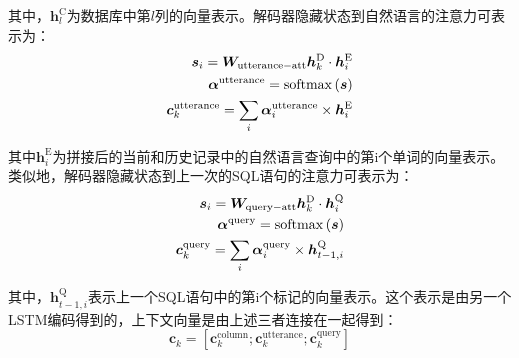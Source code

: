 其中，$\bm{h}_l^\mathrm{C}$为数据库中第$l$列的向量表示。解码器隐藏状态到自然语言的注意力可表示为：
\begin{align}
    \bm{s}_i=\bm{W}_\mathrm{utterance-att}\bm{h}_k^\mathrm{D}\cdot\bm{h}_i^\mathrm{E}\\
    \bm{\alpha}^\mathrm{utterance}=\mathrm{softmax}\left(\bm{s}\right)\\
    \bm{c}_k^\mathrm{utterance}=\sum_{i}{\bm{\alpha}_i^\mathrm{utterance}\times\bm{h}_i^\mathrm{E}}
\end{align}

其中$\bm{h}_i^\mathrm{E}$为拼接后的当前和历史记录中的自然语言查询中的第i个单词的向量表示。类似地，解码器隐藏状态到上一次的SQL语句的注意力可表示为：
\begin{align}
    \bm{s}_i=\bm{W}_\mathrm{query-att}\bm{h}_k^\mathrm{D}\cdot\bm{h}_i^\mathrm{Q}\\
    \bm{\alpha}^\mathrm{query}=\mathrm{softmax}\left(\bm{s}\right)\\
    \bm{c}_k^\mathrm{query}=\sum_{i}{\bm{\alpha}_i^\mathrm{query}\times\bm{h}_{t-1,i}^\mathrm{Q}}
\end{align}

其中，$\bm{h}_{t-1,i}^\mathrm{Q}$表示上一个SQL语句中的第i个标记的向量表示。这个表示是由另一个LSTM编码得到的，上下文向量是由上述三者连接在一起得到：
\begin{equation}
    \bm{c}_k=\left[\bm{c}_k^\mathrm{column};\bm{c}_k^\mathrm{utterance};\bm{c}_k^\mathrm{query}\right]
\end{equation}

